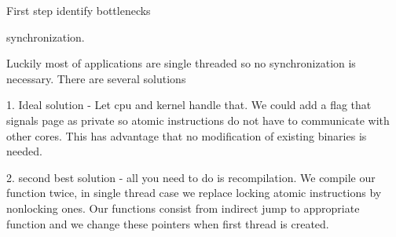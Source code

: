 First step identify bottlenecks

synchronization.

Luckily most of applications are single threaded so no synchronization is necessary. There are several solutions

1. Ideal solution - Let cpu and kernel handle that. We could add a flag that signals page as private so atomic instructions do not have to communicate with other cores. This has advantage that no modification of existing binaries is needed.

2. second best solution - all you need to do is recompilation. We compile our function twice, in single thread case we replace locking atomic instructions by nonlocking ones. Our functions consist from indirect jump to appropriate function and we change these pointers when first thread is created. 
